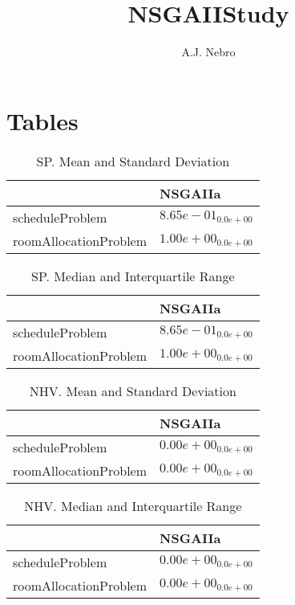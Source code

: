 \documentclass{article}
\title{NSGAIIStudy}
\author{A.J. Nebro}
\begin{document}
\maketitle
\section{Tables}

\begin{table}
\caption{SP. Mean and Standard Deviation}
\label{table: SP}
\centering
\begin{scriptsize}
\begin{tabular}{ll}
\hline &  NSGAIIa\\
\hline 
scheduleProblem & \cellcolor{gray95}$  8.65e-01_{ 0.0e+00}$ \\
roomAllocationProblem & \cellcolor{gray95}$  1.00e+00_{ 0.0e+00}$ \\
\hline
\end{tabular}
\end{scriptsize}
\end{table}

\begin{table}
\caption{SP. Median and Interquartile Range}
\label{table: SP}
\centering
\begin{scriptsize}
\begin{tabular}{ll}
\hline &  NSGAIIa\\
\hline 
scheduleProblem & \cellcolor{gray95}$  8.65e-01_{ 0.0e+00}$ \\
roomAllocationProblem & \cellcolor{gray95}$  1.00e+00_{ 0.0e+00}$ \\
\hline
\end{tabular}
\end{scriptsize}
\end{table}

\begin{table}
\caption{NHV. Mean and Standard Deviation}
\label{table: NHV}
\centering
\begin{scriptsize}
\begin{tabular}{ll}
\hline &  NSGAIIa\\
\hline 
scheduleProblem & \cellcolor{gray95}$  0.00e+00_{ 0.0e+00}$ \\
roomAllocationProblem & \cellcolor{gray95}$  0.00e+00_{ 0.0e+00}$ \\
\hline
\end{tabular}
\end{scriptsize}
\end{table}

\begin{table}
\caption{NHV. Median and Interquartile Range}
\label{table: NHV}
\centering
\begin{scriptsize}
\begin{tabular}{ll}
\hline &  NSGAIIa\\
\hline 
scheduleProblem & \cellcolor{gray95}$  0.00e+00_{ 0.0e+00}$ \\
roomAllocationProblem & \cellcolor{gray95}$  0.00e+00_{ 0.0e+00}$ \\
\hline
\end{tabular}
\end{scriptsize}
\end{table}
\end{document}
